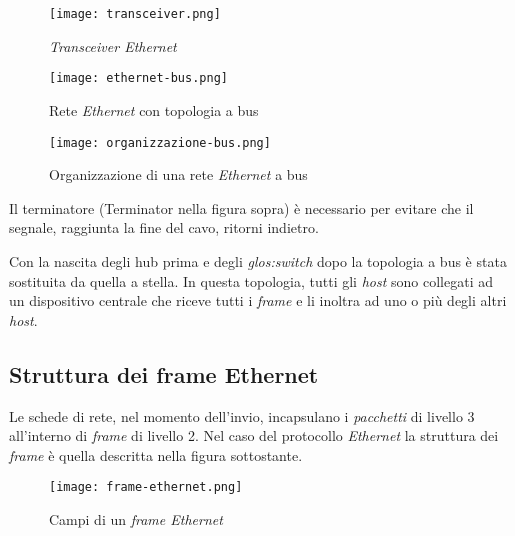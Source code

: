 \begin{figure}[h!]
    \centering
    \texttt{[image: transceiver.png]}
    \caption{\emph{Transceiver Ethernet}}
\end{figure}

\begin{figure}[ht!]
    \centering
    \texttt{[image: ethernet-bus.png]}
    \caption{Rete \emph{Ethernet} con topologia a bus}
\end{figure}

\begin{figure}[ht!]
    \centering
    \texttt{[image: organizzazione-bus.png]}
    \caption{Organizzazione di una rete \emph{Ethernet} a bus}
\end{figure}

\noindent
Il terminatore (Terminator nella figura sopra) è necessario per evitare che il
segnale, raggiunta la fine del cavo, ritorni indietro.

Con la nascita degli hub prima e degli \emph{\gls{glos:switch}} dopo la
topologia a bus è stata sostituita da quella a stella. In questa topologia,
tutti gli \emph{host} sono collegati ad un dispositivo centrale che riceve
tutti i \emph{frame} e li inoltra ad uno o più degli altri \emph{host}.

\subsection{Struttura dei frame Ethernet}
Le schede di rete, nel momento dell'invio, incapsulano i \emph{pacchetti} di
livello 3 all'interno di \emph{frame} di livello 2. Nel caso del protocollo
\emph{Ethernet} la struttura dei \emph{frame} è quella descritta nella figura
sottostante.
\begin{figure}[h!]
    \centering
    \texttt{[image: frame-ethernet.png]}
    \caption{Campi di un \emph{frame Ethernet}}
\end{figure}

